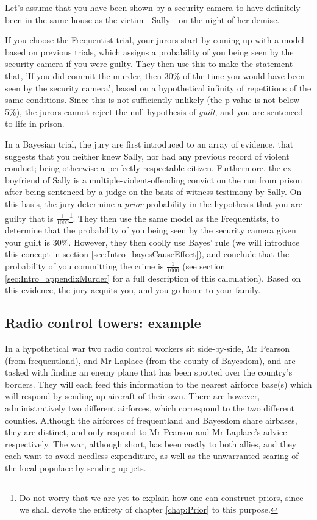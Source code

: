 \documentclass[11pt,fullpage]{book}
\begin{document}
Let's assume that you have been shown by a security camera to have definitely been in the same house as the victim - Sally - on the night of her demise. 

If you choose the Frequentist trial, your jurors start by coming up with a model based on previous trials, which assigns a probability of you being seen by the security camera if you were guilty. They then use this to make the statement that, 'If you did commit the murder, then 30\% of the time you would have been seen by the security camera', based on a hypothetical infinity of repetitions of the same conditions. Since this is not sufficiently unlikely (the p value is not below 5\%), the jurors cannot reject the null hypothesis of \textit{guilt}, and you are sentenced to life in prison.

In a Bayesian trial, the jury are first introduced to an array of evidence, that suggests that you neither knew Sally, nor had any previous record of violent conduct; being otherwise a perfectly respectable citizen. Furthermore, the ex-boyfriend of Sally is a multiple-violent-offending convict on the run from prison after being sentenced by a judge on the basis of witness testimony by Sally. On this basis, the jury determine a \textit{prior} probability in the hypothesis that you are guilty that is $\frac{1}{1000}$\footnote{Do not worry that we are yet to explain how one can construct priors, since we shall devote the entirety of chapter \ref{chap:Prior} to this purpose.}. They then use the same model as the Frequentists, to determine that the probability of you being seen by the security camera given your guilt is 30\%. However, they then coolly use Bayes' rule (we will introduce this concept in section \ref{sec:Intro_bayesCauseEffect}), and conclude that the probability of you committing the crime is $\frac{1}{1000}$ (see section \ref{sec:Intro_appendixMurder} for a full description of this calculation). Based on this evidence, the jury acquits you, and you go home to your family.

\subsection{Radio control towers: example}
In a hypothetical war two radio control workers sit side-by-side, Mr Pearson (from frequentland), and Mr Laplace (from the county of Bayesdom), and are tasked with finding an enemy plane that has been spotted over the country's borders. They will each feed this information to the nearest airforce base(s) which will respond by sending up aircraft of their own. There are however, administratively two different airforces, which correspond to the two different counties. Although the airforces of frequentland and Bayesdom share airbases, they are distinct, and only respond to Mr Pearson and Mr Laplace's advice respectively. The war, although short, has been costly to both allies, and they each want to avoid needless expenditure, as well as the unwarranted scaring of the local populace by sending up jets.
\end{document}
